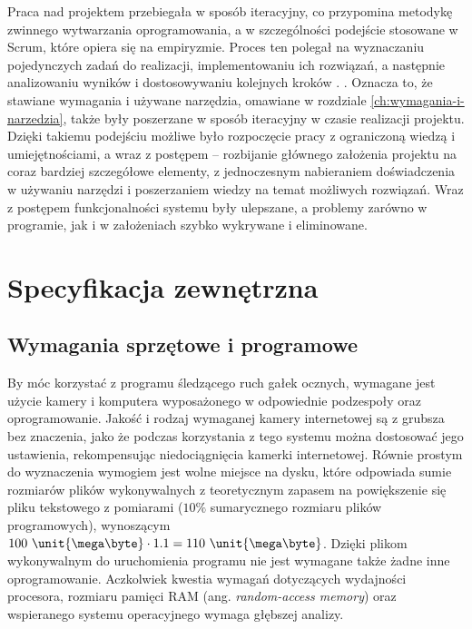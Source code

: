 \documentclass[a4paper,twoside,12pt]{book}
\newcommand{\obcy}[1]{\emph{#1}}
\newcommand{\english}[1]{{\selectlanguage{british}\obcy{#1}}}
\begin{document}
Praca nad projektem przebiegała w sposób iteracyjny, co przypomina metodykę zwinnego wytwarzania oprogramowania, a w szczególności podejście stosowane w Scrum, które opiera się na empiryzmie. Proces ten polegał na wyznaczaniu pojedynczych zadań do realizacji, implementowaniu ich rozwiązań, a następnie analizowaniu wyników i dostosowywaniu kolejnych kroków \cite{bib:Scrum-guide}. . Oznacza to, że stawiane wymagania i używane narzędzia, omawiane w rozdziale \ref{ch:wymagania-i-narzedzia}, także były poszerzane w sposób iteracyjny w czasie realizacji projektu. Dzięki takiemu podejściu możliwe było rozpoczęcie pracy z ograniczoną wiedzą i umiejętnościami, a wraz z postępem -- rozbijanie głównego założenia projektu na coraz bardziej szczegółowe elementy, z jednoczesnym nabieraniem doświadczenia w używaniu narzędzi i poszerzaniem wiedzy na temat możliwych rozwiązań. Wraz z postępem funkcjonalności systemu były ulepszane, a problemy zarówno w programie, jak i w założeniach szybko wykrywane i eliminowane.




%
%
%
\chapter{Specyfikacja zewnętrzna}
\label{ch:Specyfikacja-zewnetrzna}

\section{Wymagania sprzętowe i programowe}


By móc korzystać z programu śledzącego ruch gałek ocznych, wymagane jest użycie kamery i komputera wyposażonego w odpowiednie podzespoły oraz oprogramowanie. Jakość i rodzaj wymaganej kamery internetowej są z grubsza bez znaczenia, jako że podczas korzystania z tego systemu można dostosować jego ustawienia, rekompensując niedociągnięcia kamerki internetowej. Równie prostym do wyznaczenia wymogiem jest wolne miejsce na dysku, które odpowiada sumie rozmiarów plików wykonywalnych z teoretycznym zapasem na powiększenie się pliku tekstowego z pomiarami ($10\%$ sumarycznego rozmiaru plików programowych), wynoszącym $100 \ \unit{\mega\byte} \cdot 1.1 = 110 \ \unit{\mega\byte}$. Dzięki plikom wykonywalnym do uruchomienia programu nie jest wymagane także żadne inne oprogramowanie. Aczkolwiek kwestia wymagań dotyczących wydajności procesora, rozmiaru pamięci RAM (ang. \english{random-access memory}) oraz wspieranego systemu operacyjnego wymaga głębszej analizy.
\end{document}
